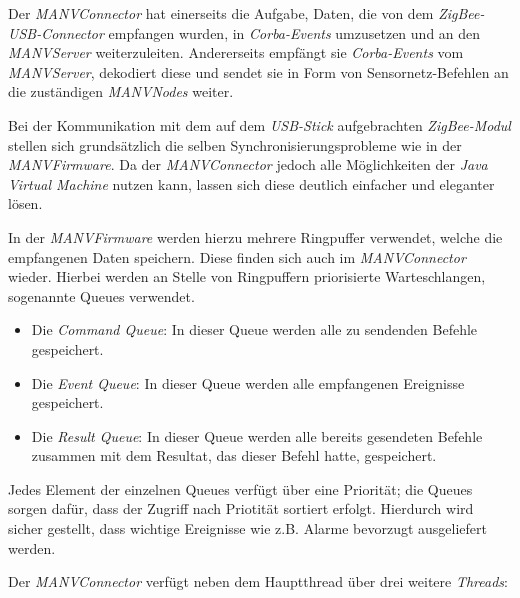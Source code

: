 Der \emph{MANVConnector} hat einerseits die Aufgabe, Daten, die von dem \emph{ZigBee-USB-Connector} empfangen wurden, in 
\emph{Corba-Events} umzusetzen und an den \emph{MANVServer} weiterzuleiten. Andererseits empfängt sie 
\emph{Corba-Events} vom \emph{MANVServer}, dekodiert diese und sendet sie in Form von Sensornetz-Befehlen an die 
zuständigen \emph{MANVNodes} weiter.

Bei der Kommunikation mit dem auf dem \emph{USB-Stick} aufgebrachten \emph{ZigBee-Modul} stellen sich grundsätzlich 
die selben Synchronisierungsprobleme wie in der \emph{MANVFirmware}. Da der \emph{MANVConnector} jedoch alle 
Möglichkeiten der \emph{Java Virtual Machine} nutzen kann, lassen sich diese deutlich einfacher und eleganter lösen. 

In der \emph{MANVFirmware} werden hierzu mehrere Ringpuffer verwendet, welche die empfangenen Daten speichern. Diese 
finden sich auch im \emph{MANVConnector} wieder. Hierbei werden an Stelle von Ringpuffern priorisierte Warteschlangen, 
sogenannte Queues verwendet. 

\begin{itemize}
    \item{Die \emph{Command Queue}:} In dieser Queue werden alle zu sendenden Befehle gespeichert.
    \item{Die \emph{Event Queue}:} In dieser Queue werden alle empfangenen Ereignisse gespeichert.
    \item{Die \emph{Result Queue}:} In dieser Queue werden alle bereits gesendeten Befehle zusammen mit dem
                             Resultat, das dieser Befehl hatte, gespeichert.
\end{itemize}

Jedes Element der einzelnen Queues verfügt über eine Priorität; die Queues sorgen dafür, dass der
Zugriff nach Priotität sortiert erfolgt. Hierdurch wird sicher gestellt, dass wichtige Ereignisse
wie z.B. Alarme bevorzugt ausgeliefert werden.

Der \emph{MANVConnector} verfügt neben dem Hauptthread über drei weitere \emph{Threads}:

